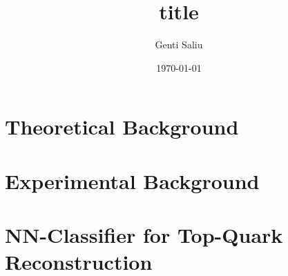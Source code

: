 \documentclass[a4paper,11pt,twoside,DIV=calc,BCOR12.5mm,headsepline,titlepage,openright,final,english]{scrbook}
\title{title}
\author{Genti Saliu}
\date{\today}
\begin{document}
\frontmatter


\cleardoublepage


\cleardoublepage


\cleardoublepage


\cleardoublepage

\setcounter{tocdepth}{2}
\tableofcontents

\mainmatter

\renewcommand{\arraystretch}{1.2}

\chapter{Theoretical Background}
\label{ch:theory}


\chapter{Experimental Background}
\label{ch:experiment}


\chapter{NN-Classifier for Top-Quark Reconstruction}
\label{ch:classifier}




\appendix




\listoftables
\listoffigures

\begingroup
\setlength{\emergencystretch}{.5em}
\printbibliography
\endgroup

\backmatter


\end{document}
